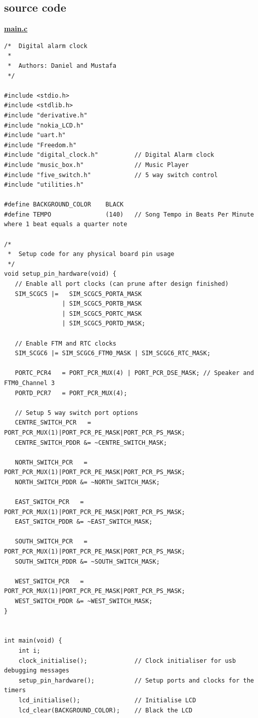 \documentclass{article}
\begin{document}
\begin{landscape}
\section{source code}
\bf{\underline{main.c}}
\begin{lstlisting}[frame=single]
/*	Digital alarm clock
 * 
 * 	Authors: Daniel and Mustafa
 */

#include <stdio.h>
#include <stdlib.h>
#include "derivative.h"
#include "nokia_LCD.h"
#include "uart.h"
#include "Freedom.h"
#include "digital_clock.h"			// Digital Alarm clock
#include "music_box.h"				// Music Player
#include "five_switch.h"			// 5 way switch control
#include "utilities.h"

#define BACKGROUND_COLOR 	BLACK
#define TEMPO				(140)	// Song Tempo in Beats Per Minute where 1 beat equals a quarter note

/*
 *  Setup code for any physical board pin usage
 */
void setup_pin_hardware(void) {
   // Enable all port clocks (can prune after design finished)
   SIM_SCGC5 |=   SIM_SCGC5_PORTA_MASK
		   	   	| SIM_SCGC5_PORTB_MASK
		   	   	| SIM_SCGC5_PORTC_MASK
		   	   	| SIM_SCGC5_PORTD_MASK;
   
   // Enable FTM and RTC clocks
   SIM_SCGC6 |= SIM_SCGC6_FTM0_MASK | SIM_SCGC6_RTC_MASK;
   
   PORTC_PCR4	= PORT_PCR_MUX(4) | PORT_PCR_DSE_MASK; // Speaker and FTM0_Channel 3
   PORTD_PCR7	= PORT_PCR_MUX(4);
   
   // Setup 5 way switch port options
   CENTRE_SWITCH_PCR   = PORT_PCR_MUX(1)|PORT_PCR_PE_MASK|PORT_PCR_PS_MASK;
   CENTRE_SWITCH_PDDR &= ~CENTRE_SWITCH_MASK;
   
   NORTH_SWITCH_PCR   = PORT_PCR_MUX(1)|PORT_PCR_PE_MASK|PORT_PCR_PS_MASK;
   NORTH_SWITCH_PDDR &= ~NORTH_SWITCH_MASK;   
   
   EAST_SWITCH_PCR   = PORT_PCR_MUX(1)|PORT_PCR_PE_MASK|PORT_PCR_PS_MASK;
   EAST_SWITCH_PDDR &= ~EAST_SWITCH_MASK;
   
   SOUTH_SWITCH_PCR   = PORT_PCR_MUX(1)|PORT_PCR_PE_MASK|PORT_PCR_PS_MASK;
   SOUTH_SWITCH_PDDR &= ~SOUTH_SWITCH_MASK;
   
   WEST_SWITCH_PCR   = PORT_PCR_MUX(1)|PORT_PCR_PE_MASK|PORT_PCR_PS_MASK;
   WEST_SWITCH_PDDR &= ~WEST_SWITCH_MASK;
}


int main(void) {
	int i;
	clock_initialise();				// Clock initialiser for usb debugging messages
	setup_pin_hardware();			// Setup ports and clocks for the timers
	lcd_initialise();				// Initialise LCD
	lcd_clear(BACKGROUND_COLOR);	// Black the LCD


\end{lstlisting}
\end{landscape}
\end{document}
